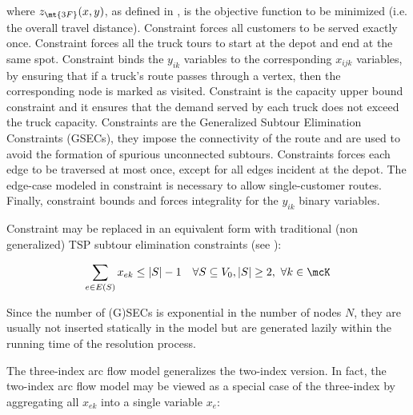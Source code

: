 where $z_\mt{3F}(x, y)$, as defined in , is the objective function to be minimized (i.e. the overall travel distance).
Constraint  forces all customers to be served exactly once.
Constraint  forces all the truck tours to start at the depot and end at the same spot.
Constraint  binds the $y_{ik}$ variables to the corresponding $x_{ijk}$ variables, by ensuring that if a truck's route passes through a vertex, then the corresponding node is marked as visited.
Constraint  is the capacity upper bound constraint and it ensures that the demand served by each truck does not exceed the truck capacity.
Constraints  are the Generalized Subtour Elimination Constraints (GSECs), they impose the connectivity of the route and are used to avoid the formation of spurious unconnected subtours.
Constraints  forces each edge to be traversed at most once,
except for all edges incident at the depot.
The edge-case modeled in constraint 
is necessary to allow single-customer routes.
Finally, constraint 
bounds and forces integrality for the $y_{ik}$ binary variables.

Constraint  may be replaced in an equivalent form
with traditional (non generalized) TSP subtour elimination constraints (see \textcite{fisher1981}):

\begin{equation}\label{eq:three-index-flow-secv2}
	\sum_{e \in E(S)} x_{ek} \le |S| - 1 \quad \forall S \subseteq V_0, |S| \ge 2,\ \forall k \in \mcK
\end{equation}

Since the number of (G)SECs is exponential in the number of nodes $N$, they are usually not inserted statically in the model but are generated lazily within the running time of the resolution process.

The three-index arc flow model generalizes the two-index version.
In fact, the two-index arc flow model may be viewed as a special case of the three-index by aggregating
all $x_{ek}$ into a single variable $x_e$:

